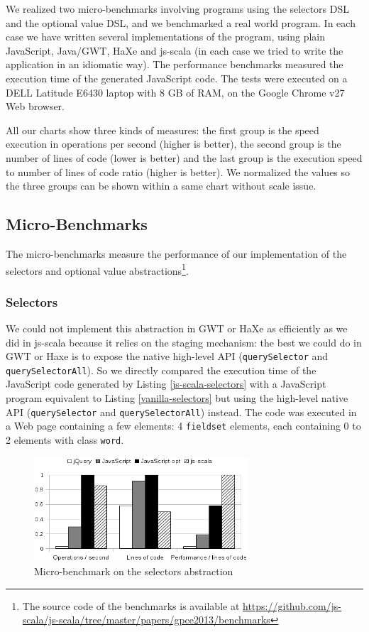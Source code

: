 \documentclass{llncs}
\newcommand{\code}[1]{\lstinline[language=Scala,columns=fixed,basicstyle=\footnotesize]|#1|}
\begin{document}
We realized two micro-benchmarks involving programs using the selectors DSL and the
optional value DSL, and we benchmarked a real world program. In each case we have written several
implementations of the program, using plain JavaScript, Java/GWT, HaXe and js-scala (in each case we
tried to write the application in an idiomatic way). The performance benchmarks measured the
execution time of the generated JavaScript code. The tests were executed on a DELL Latitude E6430
laptop with 8 GB of RAM, on the Google Chrome v27 Web browser.

All our charts show three kinds of measures: the first group is the speed execution in operations
per second (higher is better), the second group is the number of lines of code (lower is better) and
the last group is the execution speed to number of lines of code ratio (higher is better). We
normalized the values so the three groups can be shown within a same chart without scale issue.

\subsection{Micro-Benchmarks}

The micro-benchmarks measure the performance of our implementation of the selectors and optional
value abstractions\footnote{The source code of the benchmarks is available at
\href{https://github.com/js-scala/js-scala/tree/master/papers/gpce2013/benchmarks}{
https://github.com/js-scala/js-scala/tree/master/papers/gpce2013/benchmarks}}.

\subsubsection{Selectors}

We could not implement this abstraction in GWT or HaXe as efficiently as we did in js-scala because
it relies on the staging mechanism: the best we could do in GWT or Haxe is to expose the native
high-level API (\code{querySelector} and \code{querySelectorAll}). So we directly compared the
execution time of the JavaScript code generated by Listing \ref{js-scala-selectors} with a
JavaScript program equivalent to Listing \ref{vanilla-selectors} but using the high-level native
API (\code{querySelector} and \code{querySelectorAll}) instead. The code was executed in a Web page
containing a few elements: 4 \code{fieldset} elements, each containing 0 to 2 elements with class
\code{word}.

\begin{figure}
\centering
\includegraphics[width=8cm]{gpce19c-foy-selectors-benchmark.png}
\caption{Micro-benchmark on the selectors abstraction}
\label{fig:selectors-benchmark}
\end{figure}
\end{document}
